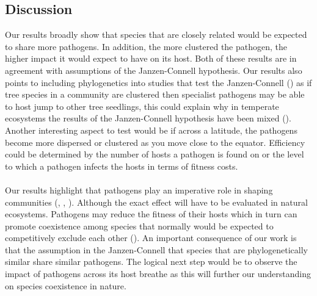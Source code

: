 \documentclass{article}
\begin{document}
\subsection{Discussion}
Our results broadly show that species that are closely related would be expected to share more pathogens. In addition, the more clustered the pathogen, the higher impact it would expect to have on its host. Both of these results are in agreement with assumptions of the Janzen-Connell hypothesis. Our results also points to including phylogenetics into studies that test the Janzen-Connell (\citep{Liu2012}) as if tree species in a community are clustered then specialist pathogens may be able to host jump to other tree seedlings, this could explain why in temperate ecosystems the results of the Janzen-Connell hypothesis have been mixed (\citep{Hyatt2003}). Another interesting aspect to test would be if across a latitude, the pathogens become more dispersed or clustered as you move close to the equator. Efficiency could be determined by the number of hosts a pathogen is found on or the level to which a pathogen infects the hosts in terms of fitness costs. 

\paragraph{}Our results highlight that pathogens play an imperative role in shaping communities (\citep{Janzen1970}, \citep{Connell1978}, \citep{Bush1997}). Although the exact effect will have to be evaluated in natural ecosystems. Pathogens may reduce the fitness of their hosts which in turn can promote coexistence among species that normally would be expected to competitively exclude each other (\citep{Spear2018}). An important consequence of our work is that the assumption in the Janzen-Connell that species that are phylogenetically similar share similar pathogens. The logical next step would be to observe the impact of pathogens across its host breathe as this will further our understanding on species coexistence in nature. 



\end{document}
